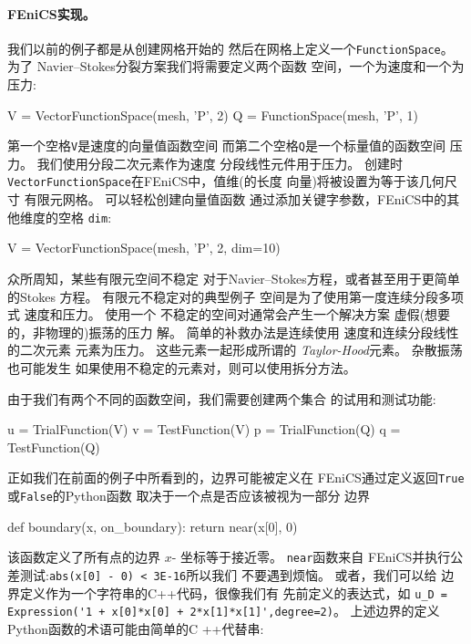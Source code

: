 \paragraph{FEniCS实现。}
我们以前的例子都是从创建网格开始的
然后在网格上定义一个\texttt{FunctionSpace}。 为了
Navier--Stokes分裂方案我们将需要定义两个函数
空间，一个为速度和一个为压力:

\begin{python}
V = VectorFunctionSpace(mesh, 'P', 2)
Q = FunctionSpace(mesh, 'P', 1)
\end{python}
第一个空格\texttt{V}是速度的向量值函数空间
而第二个空格\texttt{Q}是一个标量值的函数空间
压力。 我们使用分段二次元素作为速度
分段线性元件用于压力。 创建时
\texttt{VectorFunctionSpace}在FEniCS中，值维(的长度
向量)将被设置为等于该几何尺寸
有限元网格。 可以轻松创建向量值函数
通过添加关键字参数，FEniCS中的其他维度的空格
\texttt{dim}:


\begin{python}
V = VectorFunctionSpace(mesh, 'P', 2, dim=10)
\end{python}

\begin{notice}
众所周知，某些有限元空间不稳定
对于Navier--Stokes方程，或者甚至用于更简单的Stokes
方程。 有限元不稳定对的典型例子
空间是为了使用第一度连续分段多项式
速度和压力。 使用一个
不稳定的空间对通常会产生一个解决方案
虚假(想要的，非物理的)振荡的压力
解。 简单的补救办法是连续使用
速度和连续分段线性的二次元素
元素为压力。 这些元素一起形成所谓的
\emph{Taylor-Hood}元素。 杂散振荡也可能发生
如果使用不稳定的元素对，则可以使用拆分方法。
\end{notice}

由于我们有两个不同的函数空间，我们需要创建两个集合
的试用和测试功能:

\begin{python}
u = TrialFunction(V)
v = TestFunction(V)
p = TrialFunction(Q)
q = TestFunction(Q)
\end{python}


正如我们在前面的例子中所看到的，边界可能被定义在
FEniCS通过定义返回\texttt{True}或\texttt{False}的Python函数
取决于一个点是否应该被视为一部分
边界

\begin{python}
def boundary(x, on_boundary):
    return near(x[0], 0)
\end{python}
该函数定义了所有点的边界
$x$- 坐标等于接近零。 \texttt{near}函数来自
FEniCS并执行公差测试:\texttt{abs(x[0] - 0) < 3E-16}所以我们
不要遇到烦恼。 或者，我们可以给
边界定义作为一个字符串的C++代码，很像我们有
先前定义的表达式，如
\verb!u_D = Expression('1 + x[0]*x[0] + 2*x[1]*x[1]',degree=2)!。
上述边界的定义Python函数的术语可能由简单的C ++代替串:

